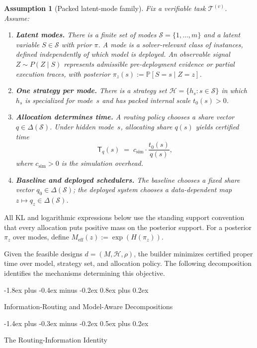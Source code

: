 \documentclass[10pt,twocolumn]{article}
\makeatletter
\theoremstyle{paperplain}
\theoremstyle{paperdefinition}
\newtheorem{assumption}[theorem]{Assumption}
\theoremstyle{paperremark}
\renewcommand{\section}{%
  \@startsection{section}{1}{\z@}%
    {-1.8ex plus -0.4ex minus -0.2ex}%
    {0.8ex plus 0.2ex}%
    {\normalfont\large\bfseries\raggedright}}
\renewcommand{\subsection}{%
  \@startsection{subsection}{2}{\z@}%
    {-1.4ex plus -0.3ex minus -0.2ex}%
    {0.5ex plus 0.2ex}%
    {\normalfont\normalsize\bfseries\raggedright}}
\newcommand{\Prb}{\mathbb{P}}
\newcommand{\cS}{\mathcal{S}}
\newcommand{\cT}{\mathcal{T}}
\newcommand{\Meff}{M_{\mathrm{eff}}}
\makeatother
\begin{document}
\begin{assumption}[Packed latent-mode family]
\label{def:packed-family}
\label{ass:packed-family}
Fix a verifiable task $\cT^{(v)}$.
Assume:
\begin{enumerate}
\item \textbf{Latent modes.} There is a finite set of modes $\cS=\{1,\ldots,m\}$ and a latent variable $S \in \cS$ with prior $\pi$. A mode is a solver-relevant class of instances, defined independently of which model is deployed. An observable signal $Z \sim P(Z \mid S)$ represents admissible pre-deployment evidence or partial execution traces, with posterior $\pi_z(s) := \Prb[S = s \mid Z=z]$.
\item \textbf{One strategy per mode.} There is a strategy set
$\mathcal H=\{h_s:s\in\cS\}$ in which $h_s$ is specialized for mode~$s$ and
has packed internal scale $t_0(s)>0$.
\item \textbf{Allocation determines time.} A routing policy chooses a share vector $q \in \Delta(\cS)$.
Under hidden mode~$s$, allocating share $q(s)$ yields certified time
\[
\mathsf{T}_q(s) \;=\; c_{\mathrm{sim}} \cdot \frac{t_0(s)}{q(s)},
\]
where $c_{\mathrm{sim}}>0$ is the simulation overhead.
\item \textbf{Baseline and deployed schedulers.} The baseline chooses a fixed share vector $q_0 \in \Delta(\cS)$; the deployed system chooses a data-dependent map $z \mapsto q_z \in \Delta(\cS)$.
\end{enumerate}
\end{assumption}

All KL and logarithmic expressions below use the standing support convention
that every allocation puts positive mass on the posterior support.  For a
posterior $\pi_z$ over modes, define
$\Meff(z):=\exp(H(\pi_z))$.

Given the feasible designs $d=(M,\mathcal H,\rho)$, the builder minimizes
certified proper time over model, strategy set, and allocation policy.  The
following decomposition identifies the mechanisms determining this objective.

\section{Information-Routing and Model-Aware Decompositions}
\label{sec:decomposition}

\subsection{The Routing-Information Identity}
\label{subsec:ri-identity}
\end{document}

